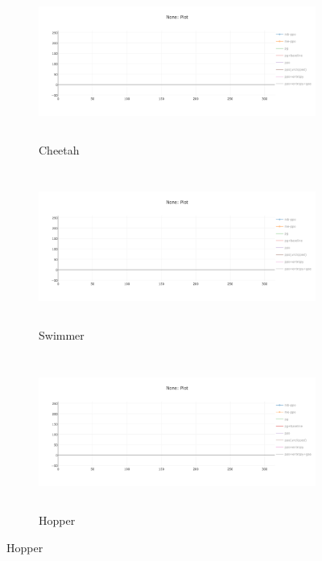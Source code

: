 \documentclass[10pt]{article}
\begin{document}
\begin{figure}[ht!]
    \centering
    \begin{subfigure}[h]{0.6\linewidth}
        \centering
        \includegraphics[height=2in]{figures/newplot.png}
        \caption{Cheetah}
    \end{subfigure}
    \vskip 0.3in
    \begin{subfigure}[h]{0.6\textwidth}
        \centering
        \includegraphics[height=2in]{figures/newplot.png}
        \caption{Swimmer}
    \end{subfigure}
    \vskip 0.3in
    \begin{subfigure}[h]{0.6\textwidth}
        \centering
        \includegraphics[height=2in]{figures/newplot.png}
        \caption{Hopper}
    \end{subfigure}
\end{figure}
\clearpage
\end{document}
